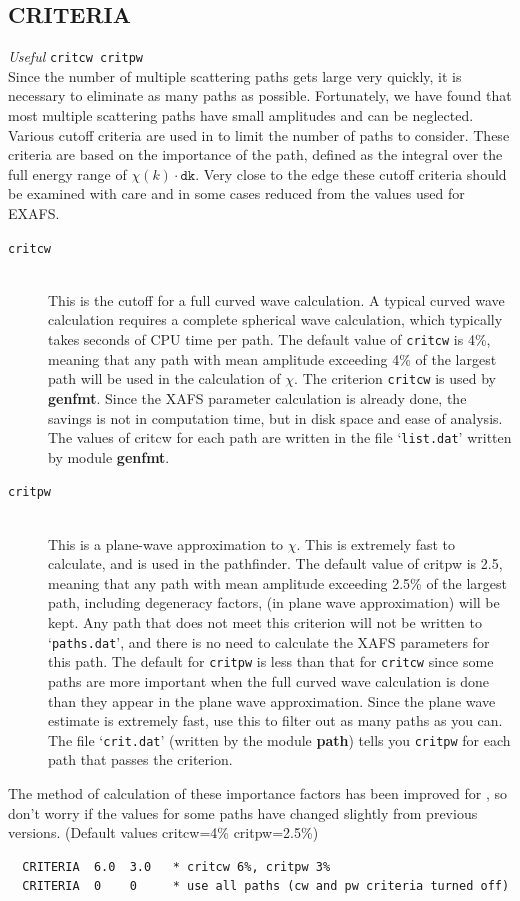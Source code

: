 \documentclass[11pt,oneside]{report} %
\newenvironment{Card}[4]%
      {\vspace{3ex}%
        \subsection{#1}
        \quad\textsl{#3}\newline
        \quad\texttt{#2}\newline%
        \label{card:#4}\\}
      {}
\newcommand{\file}[1]{`\texttt{#1}'}
\newcommand{\module}[1]{\textrm{\bf{#1}}}
\begin{document}
\begin{Card}{CRITERIA}{critcw critpw}{Useful}{cri}
  Since the number of multiple scattering paths gets large very
  quickly, it is necessary to eliminate as many paths as possible.
  Fortunately, we have found that most multiple scattering paths have
  small amplitudes and can be neglected. Various cutoff criteria
  are used in {\feffcur} to limit the number of paths to consider. These
  criteria are based on the importance of the path, defined as the
  integral over the full energy range of $\chi(k)\cdot\mathtt{dk}$.
  Very close to the edge these cutoff criteria should be examined
  with care and in some cases reduced from the values used for EXAFS.
 \begin{description}
  \item[\texttt{critcw}]\hfill\\ 
  This is the cutoff for a full curved wave calculation. A
  typical curved wave calculation requires a complete spherical wave
  calculation, which typically takes seconds of CPU time per path.
  The default value of \texttt{critcw} is 4\%, meaning that any path
  with mean amplitude exceeding 4\% of the largest path will be used in
  the calculation of $\chi$. The criterion \texttt{critcw} is used by 
  \module{genfmt}.
  Since the XAFS parameter calculation is already done, the savings is
  not in computation time, but in disk space and ease of analysis. The
  values of critcw for each path are written in the file \file{list.dat}
  written by module \module{genfmt}.

  \item[\texttt{critpw}]\hfill\\ 
  This is a plane-wave approximation to $\chi$. This is
  extremely fast to calculate, and is used in the pathfinder. The
  default value of critpw is 2.5, meaning that any path with mean
  amplitude exceeding 2.5\% of the largest path, including degeneracy 
  factors, (in plane wave approximation) will be kept. Any path that does 
  not meet this criterion will not be written to \file{paths.dat}, and 
  there is no need to calculate the XAFS parameters for this path. The
  default for \texttt{critpw} is less than that for \texttt{critcw}
  since some paths are more important when the full curved wave
  calculation is done than they appear in the plane wave
  approximation. Since the plane wave estimate is extremely fast, use
  this to filter out as many paths as you can. The file
  \file{crit.dat} (written by the module \module{path}) tells you
  \texttt{critpw} for each path that passes the criterion.
 \end{description}
  The method of calculation of these importance factors has been
  improved for {\feffcur}, so don't worry if the values for
  some paths have changed slightly from previous versions. (Default
  values critcw=4\% critpw=2.5\%)

\begin{verbatim}
  CRITERIA  6.0  3.0   * critcw 6%, critpw 3%
  CRITERIA  0    0     * use all paths (cw and pw criteria turned off)
\end{verbatim}
\end{Card}
\end{document}
